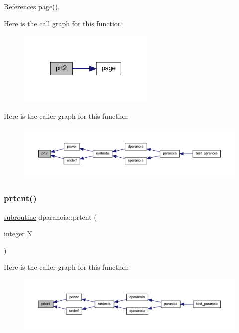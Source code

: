 References page().

Here is the call graph for this function\+:
\nopagebreak
\begin{figure}[H]
\begin{center}
\leavevmode
\includegraphics[width=187pt]{dparanoia_8f90_adb64903f8562ae9b54e1bc9688d73256_cgraph}
\end{center}
\end{figure}
Here is the caller graph for this function\+:
\nopagebreak
\begin{figure}[H]
\begin{center}
\leavevmode
\includegraphics[width=350pt]{dparanoia_8f90_adb64903f8562ae9b54e1bc9688d73256_icgraph}
\end{center}
\end{figure}
\mbox{\label{dparanoia_8f90_a639bf4ff2d08cfba91da58cd02d9ea50}} 
\subsubsection{\texorpdfstring{prtcnt()}{prtcnt()}}
{\footnotesize\ttfamily \hyperlink{M__stopwatch_83_8txt_acfbcff50169d691ff02d4a123ed70482}{subroutine} dparanoia\+::prtcnt (\begin{DoxyParamCaption}\item[{integer}]{N }\end{DoxyParamCaption})}

Here is the caller graph for this function\+:
\nopagebreak
\begin{figure}[H]
\begin{center}
\leavevmode
\includegraphics[width=350pt]{dparanoia_8f90_a639bf4ff2d08cfba91da58cd02d9ea50_icgraph}
\end{center}
\end{figure}
\mbox{\label{dparanoia_8f90_a99ac19051998d16ab21240c6ea92efa9}} 

